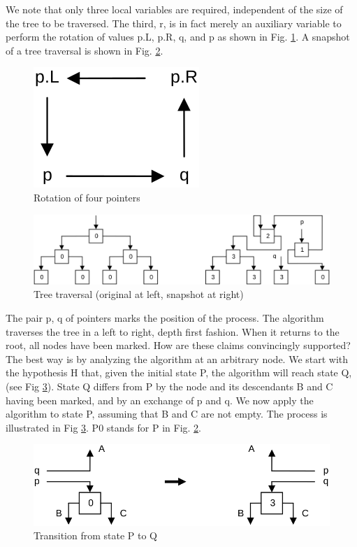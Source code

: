 We note that only three local variables are required, independent of the size of the tree to be
traversed. The third, r, is in fact merely an auxiliary variable to perform the rotation of values p.L,
p.R, q, and p as shown in Fig. \ref{fig:rotation}. A snapshot of a tree traversal is shown in Fig. \ref{fig:tree-traversal}.
\begin{figure}
	\label{fig:rotation}
	\centering
	\includegraphics[width=.25\textwidth]{i/s}
	\caption{Rotation of four pointers}
\end{figure}
\begin{figure}
	\label{fig:tree-traversal}
	\centering
	\includegraphics[width=\textwidth]{i/t}
	\caption{Tree traversal (original at left, snapshot at right)}
\end{figure}
The pair p, q of pointers marks the position of the process. The algorithm traverses the tree in a left
to right, depth first fashion. When it returns to the root, all nodes have been marked.
How are these claims convincingly supported? The best way is by analyzing the algorithm at an
arbitrary node. We start with the hypothesis H that, given the initial state P, the algorithm will reach
state Q, (see Fig \ref{fig:transition}).
State Q differs from P by the node and its descendants B and C having been marked, and by an
exchange of p and q. We now apply the algorithm to state P, assuming that B and C are not empty.
The process is illustrated in Fig \ref{fig:transition}. P0 stands for P in Fig. \ref{fig:tree-traversal}.
\begin{figure}
	\label{fig:transition}
	\centering
	\includegraphics[width=\textwidth]{i/u}
	\caption{Transition from state P to Q}
\end{figure}

